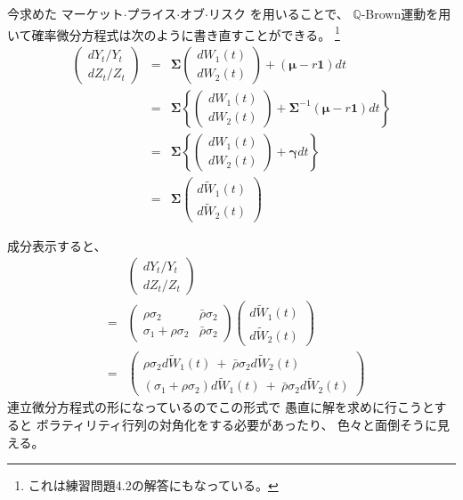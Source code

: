 \documentclass[uplatex,a4j,12pt,dvipdfmx]{jsarticle}
\begin{document}
今求めた
マーケット$\cdot$プライス$\cdot$オブ$\cdot$リスク
を用いることで、
$\mathbb{Q}$-Brown運動を用いて確率微分方程式は次のように書き直すことができる。
\footnote{これは練習問題4.2の解答にもなっている。}
%
%
\begin{eqnarray*}
	\left(
	\begin{array}{c}
			d Y_{t} / Y_{t}
			\\
			d Z_{t} / Z_{t}
		\end{array}
	\right)
	&=&
	{\bm \Sigma}
	\left(
	\begin{array}{c}
			dW_{1}(t)
			\\
			dW_{2}(t)
		\end{array}
	\right)
	+
	( {\bm \mu} - r {\bm 1} ) dt
	\\ &=&
	{\bm \Sigma}
	\left\{
	\left(
	\begin{array}{c}
			dW_{1}(t)
			\\
			dW_{2}(t)
		\end{array}
	\right)
	+
	{\bm \Sigma}^{-1}
	( {\bm \mu} - r {\bm 1} ) dt
	\right\}
	\\ &=&
	{\bm \Sigma}
	\left\{
	\left(
	\begin{array}{c}
			dW_{1}(t)
			\\
			dW_{2}(t)
		\end{array}
	\right)
	+
	{\bm \gamma} dt
	\right\}
	\\ &=&
	{\bm \Sigma}
	\left(
	\begin{array}{c}
			d \tilde{W}_{1}(t)
			\\
			d \tilde{W}_{2}(t)
		\end{array}
	\right)
\end{eqnarray*}
%
%

成分表示すると、
%
%
\begin{eqnarray*}
	&&
	\left(
	\begin{array}{c}
		d Y_{t} / Y_{t}
		\\
		d Z_{t} / Z_{t}
	\end{array}
	\right)
	\\ &=&
	\left(
	\begin{array}{cc}
		\rho \sigma_{2}              & \bar{\rho} \sigma_{2}
		\\
		\sigma_{1} + \rho \sigma_{2} & \bar{\rho} \sigma_{2}
	\end{array}
	\right)
	\left(
	\begin{array}{c}
		d \tilde{W}_{1}(t)
		\\
		d \tilde{W}_{2}(t)
	\end{array}
	\right)
	\\ &=&
	\left(
	\begin{array}{l}
		\rho \sigma_{2} d \tilde{W}_{1}(t) \ + \ \bar{\rho} \sigma_{2} d \tilde{W}_{2}(t)
		\\
		( \sigma_{1} + \rho \sigma_{2} ) d \tilde{W}_{1}(t) \ + \ \bar{\rho} \sigma_{2} d \tilde{W}_{2}(t)
	\end{array}
	\right)
\end{eqnarray*}
%
%
連立微分方程式の形になっているのでこの形式で
愚直に解を求めに行こうとすると
ボラティリティ行列の対角化をする必要があったり、
色々と面倒そうに見える。
\end{document}
